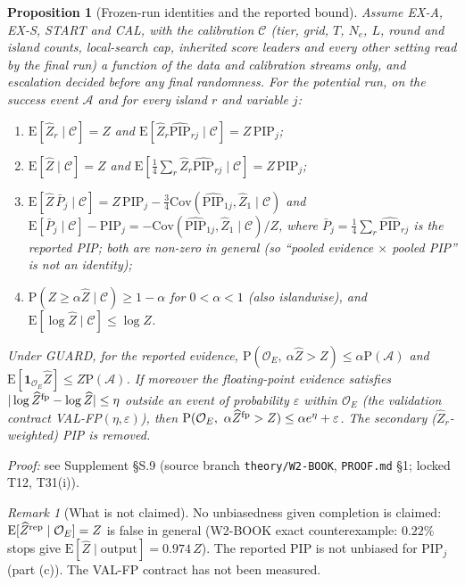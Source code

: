 \documentclass[11pt]{article}
\newtheorem{proposition}{Proposition}
\theoremstyle{definition}
\theoremstyle{remark}
\newtheorem{remark}{Remark}
\renewcommand{\Pr}{\mathrm{P}}
\newcommand{\E}{\mathrm{E}}
\newcommand{\Zh}{\widehat Z}
\newcommand{\PIPh}{\widehat{\mathrm{PIP}}}
\newcommand{\PIP}{\mathrm{PIP}}
\newcommand{\cC}{\mathcal C}
\newcommand{\cA}{\mathcal A}
\newcommand{\cO}{\mathcal O}
\newcommand{\Ind}{\mathbf 1}
\begin{document}
\begin{proposition}[Frozen-run identities and the reported bound]\label{prop:frozen}
Assume EX-A, EX-S, START and CAL, with the calibration $\cC$ (tier, grid, $T$, $N_e$, $L$, round and island counts, local-search cap, inherited score leaders and every
other setting read by the final run) a function of the data and calibration streams only, and escalation decided before any final randomness. For the potential run, on the
success event $\cA$ and for every island $r$ and variable $j$:
\begin{enumerate}
\item[(a)] $\E[\Zh_r\mid\cC]=Z$ and $\E[\Zh_r\PIPh_{rj}\mid\cC]=Z\,\PIP_j$;
\item[(b)] $\E[\Zh\mid\cC]=Z$ and $\E[\tfrac14\sum_r\Zh_r\PIPh_{rj}\mid\cC]=Z\,\PIP_j$;
\item[(c)] $\E[\Zh\,\bar P_j\mid\cC]=Z\,\PIP_j-\tfrac34\mathrm{Cov}(\PIPh_{1j},\Zh_1\mid\cC)$ and $\E[\bar P_j\mid\cC]-\PIP_j=-\mathrm{Cov}(\PIPh_{1j},\Zh_1\mid\cC)/Z$, where $\bar P_j=\tfrac14\sum_r\PIPh_{rj}$ is the reported PIP; both are non-zero in general (so ``pooled evidence $\times$ pooled PIP'' is \emph{not} an identity);
\item[(d)] $\Pr(Z\ge\alpha\Zh\mid\cC)\ge1-\alpha$ for $0<\alpha<1$ (also islandwise), and $\E[\log\Zh\mid\cC]\le\log Z$.
\end{enumerate}
Under GUARD, for the reported evidence, $\Pr(\cO_E,\ \alpha\Zh>Z)\le\alpha\Pr(\cA)$ and $\E[\Ind_{\cO_E}\Zh]\le Z\Pr(\cA)$. If moreover the floating-point evidence satisfies
$|\log\Zh^{\rm fp}-\log\Zh|\le\eta$ outside an event of probability $\varepsilon$ within $\cO_E$ (the validation contract VAL-FP$(\eta,\varepsilon)$), then
$\Pr(\cO_E,\ \alpha\Zh^{\rm fp}>Z)\le\alpha e^{\eta}+\varepsilon$. The secondary ($\Zh_r$-weighted) PIP is removed.
\end{proposition}
\noindent\emph{Proof:} see Supplement \S S.9 (source branch \texttt{theory/W2-BOOK}, \texttt{PROOF.md} \S1; locked T12, T31(i)).

\begin{remark}[What is not claimed]\label{rem:frozenno}
No unbiasedness given completion is claimed: $\E[\Zh^{\rm rep}\mid\cO_E]=Z$ is false in general (W2-BOOK exact counterexample: $0.22\%$ stops give $\E[\Zh\mid\text{output}]=0.974\,Z$). The reported PIP is not unbiased for $\PIP_j$ (part (c)). The VAL-FP contract has not been measured.
\end{remark}
\end{document}
